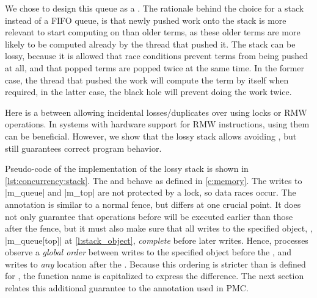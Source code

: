 We chose to design this queue as a \emph{}.
The rationale behind the choice for a stack instead of a \ac{FIFO} queue, is that newly pushed work onto the stack is more relevant to start computing on than older terms, as these older terms are more likely to be computed already by the thread that pushed it.
The stack can be lossy, because it is allowed that race conditions prevent terms from being pushed at all, and that popped terms are popped twice at the same time.
In the former case, the thread that pushed the work will compute the term by itself when required, in the latter case, the black hole will prevent doing the work twice.

Here is a  between allowing incidental losses/duplicates over using locks or \ac{RMW} operations.
In systems with hardware support for \ac{RMW} instructions, using them can be beneficial.
However, we show that the lossy stack allows avoiding , but still guarantees correct program behavior.

\label{s:concurrency:FENCE}

Pseudo-code of the implementation of the lossy stack is shown in \vref{lst:concurrency:stack}.
The   and  behave as defined in \cref{c:memory}.
The writes to \lsticode|m_queue| and \lsticode|m_top| are not protected by a lock, so data races occur.
The  annotation is similar to a normal fence, but differs at one crucial point.
It does not only guarantee that operations before will be executed earlier than those after the fence, but it must also make sure that all writes to the specified object, \eg, \lsticode|m_queue[top]| at \cref{l:stack_object}, \emph{complete} before later writes.
Hence, processes observe a \emph{global order} between writes to the specified object before the , and writes to \emph{any} location after the .
Because this ordering is stricter than is defined for , the function name is capitalized to express the difference.
The next section relates this additional guarantee to the  annotation used in \ac{PMC}.

